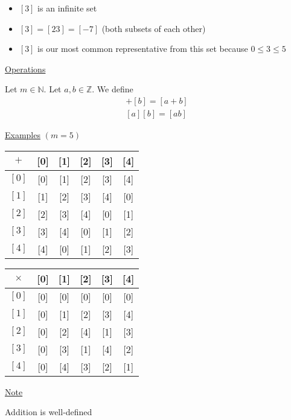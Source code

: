 \documentclass{article}
\begin{document}
\begin{itemize}
    \item $[3]$ is an infinite set
    \item $[3] = [23] = [-7]$ (both subsets of each other)
    \item $[3]$ is our most common representative from this set because $0 \le 3 \le 5$
\end{itemize}

\underline{Operations}

Let $m \in \mathbb{N}$. Let $a,b \in \mathbb{Z}$. We define 
\begin{align*}
    [a] + [b] = [a + b]\\
    [a][b] = [ab]
\end{align*}

\underline{Examples} $(m=5)$


\begin{table}[!h]
    \centering
    \begin{tabular}{c|ccccc}  
        $+$ & [0] & [1] & [2] & [3] & [4]\\ \hline 
        $[0]$ & [0] & [1] & [2] & [3] & [4]\\  
        $[1]$ & [1] & [2] & [3] & [4] & [0]\\
        $[2]$ & [2] & [3] & [4] & [0] & [1]\\
        $[3]$ & [3] & [4] & [0] & [1] & [2]\\
        $[4]$ & [4] & [0] & [1] & [2] & [3]\\
    \end{tabular}
\end{table}

\begin{table}[!h]
    \centering
    \begin{tabular}{c|ccccc}  
        $\times$ & [0] & [1] & [2] & [3] & [4]\\ \hline 
        $[0]$ & [0] & [0] & [0] & [0] & [0]\\  
        $[1]$ & [0] & [1] & [2] & [3] & [4]\\
        $[2]$ & [0] & [2] & [4] & [1] & [3]\\
        $[3]$ & [0] & [3] & [1] & [4] & [2]\\
        $[4]$ & [0] & [4] & [3] & [2] & [1]\\
    \end{tabular}
\end{table}

\underline{Note}

Addition is well-defined
\end{document}
